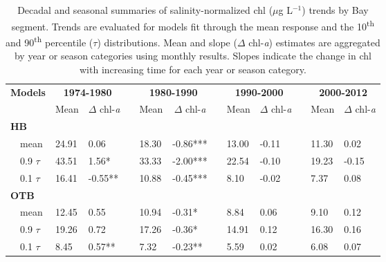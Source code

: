 \documentclass[letterpaper,12pt,oneside]{article}\usepackage[]{graphicx}\usepackage[]{color}
\newcommand{\mugl}{$\mu$g L$^{-1}$}
\begin{document}
%
\begin{table}[!tbp]
\caption{Decadal and seasonal summaries of salinity-normalized \ac{chl} (\mugl) trends by Bay segment. Trends are evaluated for models fit through the mean response and the 10\textsuperscript{th} and 90\textsuperscript{th} percentile ($\tau$) distributions.  Mean and slope ($\Delta$ chl-\textit{a}) estimates are aggregated by year or season categories using monthly results.  Slopes indicate the change in \ac{chl} with increasing time for each year or season category.\label{tab:trendsal}} 
\begin{center}
\begin{tabular}{lllcllcllcll}
\hline\hline
\multicolumn{1}{l}{\bfseries Models}&\multicolumn{2}{c}{\bfseries {\bf 1974-1980}}&\multicolumn{1}{c}{\bfseries }&\multicolumn{2}{c}{\bfseries {\bf 1980-1990}}&\multicolumn{1}{c}{\bfseries }&\multicolumn{2}{c}{\bfseries {\bf 1990-2000}}&\multicolumn{1}{c}{\bfseries }&\multicolumn{2}{c}{\bfseries {\bf 2000-2012}}\tabularnewline
\cline{2-3} \cline{5-6} \cline{8-9} \cline{11-12}
\multicolumn{1}{l}{}&\multicolumn{1}{c}{Mean}&\multicolumn{1}{c}{$\Delta$ chl-\textit{a}}&\multicolumn{1}{c}{}&\multicolumn{1}{c}{Mean}&\multicolumn{1}{c}{$\Delta$ chl-\textit{a}}&\multicolumn{1}{c}{}&\multicolumn{1}{c}{Mean}&\multicolumn{1}{c}{$\Delta$ chl-\textit{a}}&\multicolumn{1}{c}{}&\multicolumn{1}{c}{Mean}&\multicolumn{1}{c}{$\Delta$ chl-\textit{a}}\tabularnewline
\hline
{\bfseries HB}&&&&&&&&&&&\tabularnewline
~~mean&24.91& 0.06 &&18.30&-0.86***&&13.00&-0.11 &&11.30& 0.02 \tabularnewline
~~0.9 $\tau$&43.51& 1.56*&&33.33&-2.00***&&22.54&-0.10 &&19.23&-0.15 \tabularnewline
~~0.1 $\tau$&16.41&-0.55**&&10.88&-0.45***&& 8.10&-0.02 && 7.37& 0.08 \tabularnewline
\hline
{\bfseries OTB}&&&&&&&&&&&\tabularnewline
~~mean&12.45& 0.55 &&10.94&-0.31*&& 8.84& 0.06 && 9.10& 0.12 \tabularnewline
~~0.9 $\tau$&19.26& 0.72 &&17.26&-0.36*&&14.91& 0.12 &&16.30& 0.16 \tabularnewline
~~0.1 $\tau$& 8.45& 0.57**&& 7.32&-0.23**&& 5.59& 0.02 && 6.08& 0.07 \tabularnewline

\end{tabular}
\end{center}
\end{table}
\end{document}
